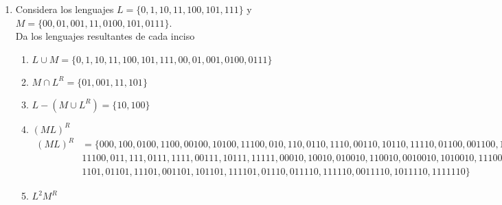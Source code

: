 \documentclass{article}
\begin{document}
\begin{enumerate}
        \item {
            Considera los lenguajes $L = \{ 0, 1, 10, 11, 100, 101, 111 \}$ y 
            $M = \{ 00, 01, 001, 11, 0100, 101, 0111 \}$.\\
            Da los lenguajes resultantes de cada inciso
            \begin{enumerate}
                \item {
                    $L \cup M = \{0, 1, 10, 11, 100, 101, 111, 00, 01, 001, 0100, 0111 \}$ 
                }
                \item {
                    $M \cap L^R = \{01, 001, 11, 101 \}$
                }
                \item {
                    $L - (M \cup L^R) = \{10, 100 \}$
                }
                \item {
                $(ML)^R$
                \begin{align*}
                    (ML)^R &= \{000, 100, 0100, 1100, 00100, 10100, 11100, 010, 110, 0110, 1110, 00110, 10110, 11110, 01100,001100, 101100,&\\
                     &11100, 011, 111, 0111, 1111, 00111, 10111, 11111, 00010, 10010, 010010, 110010, 0010010, 1010010, 1110010, 0101,&\\ &1101,
                      01101, 11101, 001101, 101101, 111101, 01110, 011110, 111110, 0011110, 1011110, 1111110 \}&
                 \end{align*}
                }
                \item {
                $L^2M^R$
                \begin{align*}                        

\end{align*}}
\end{enumerate}}
\end{enumerate}
\end{document}
